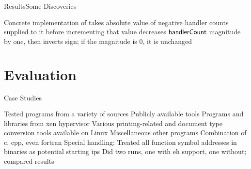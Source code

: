 \begin{frame}{Results}{Some Discoveries}
  \begin{outline}
    \1 Concrete implementation of  takes absolute value of negative handler counts supplied to it before incrementing that value
    \1  decreases $\mathsf{handlerCount}$ magnitude by one, then inverts sign; if the magnitude is 0, it is unchanged
  \end{outline}
\end{frame}

\section{Evaluation}
\begin{frame}{Case Studies}
  \begin{outline}
    \1<+-> Tested  programs from a variety of sources
    \2 Publicly available  tools
    \2 Programs and libraries from \gls{xen} hypervisor
    \2 Various printing-related and document type conversion tools available on Linux
    \2 Miscellaneous other programs
    \1<+-> Combination of \gls{c}, \gls{cpp}, even \gls{fortran}
    \1<+-> Special handling:
    \2<+-> Treated all function symbol addresses in binaries as potential starting \glspl{ip}
    \2<+-> Did two runs, one with \gls{eh} support, one without; compared results
  \end{outline}
\end{frame}

